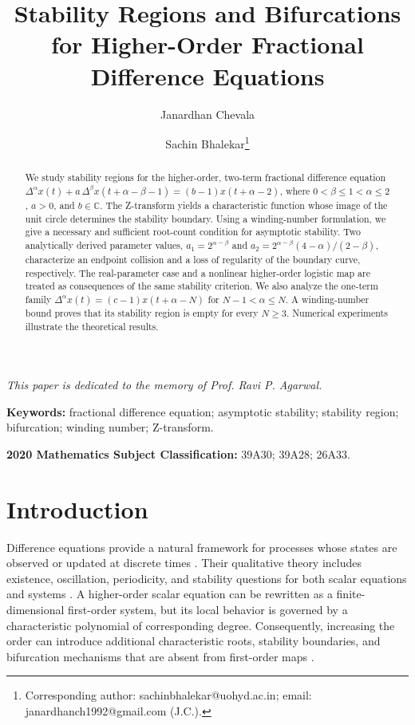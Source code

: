 \documentclass[11pt,a4paper]{article}
\title{Stability Regions and Bifurcations for Higher-Order Fractional Difference Equations}
\author{Janardhan Chevala}
\author{Sachin Bhalekar\footnote{Corresponding author: sachinbhalekar@uohyd.ac.in; email: janardhanch1992@gmail.com (J.C.).}}
\affil{School of Mathematics and Statistics, University of Hyderabad, Hyderabad 500046, India}
\date{}
\theoremstyle{definition}
\begin{document}
	
	\maketitle
\textit{This paper is dedicated to the memory of Prof. Ravi P. Agarwal.}
\begin{abstract}
We study stability regions for the higher-order, two-term fractional difference equation $\Delta^{\alpha}x(t) + a\,\Delta^{\beta}x(t + \alpha - \beta - 1) = (b - 1)x(t + \alpha - 2)$, where $0 < \beta \leq 1 < \alpha \leq 2$, $a > 0$, and $b \in \mathbb{C}$. The Z-transform yields a characteristic function whose image of the unit circle determines the stability boundary. Using a winding-number formulation, we give a necessary and sufficient root-count condition for asymptotic stability. Two analytically derived parameter values, $a_1 = 2^{\alpha-\beta}$ and $a_2 = 2^{\alpha-\beta}(4 - \alpha)/(2 - \beta)$, characterize an endpoint collision and a loss of regularity of the boundary curve, respectively. The real-parameter case and a nonlinear higher-order logistic map are treated as consequences of the same stability criterion. We also analyze the one-term family $\Delta^{\alpha}x(t) = (c - 1)x(t + \alpha - N)$ for $N - 1 < \alpha \leq N$. A winding-number bound proves that its stability region is empty for every $N \geq 3$. Numerical experiments illustrate the theoretical results.
\end{abstract}	
\medskip
\noindent\textbf{Keywords:} fractional difference equation; asymptotic stability; stability region; bifurcation; winding number; Z-transform.

\noindent\textbf{2020 Mathematics Subject Classification:} 39A30; 39A28; 26A33.


\section{Introduction} 
Difference equations provide a natural framework for processes whose states are observed or updated at discrete times \cite{kelley2001difference,elaydi2005introduction}. Their qualitative theory includes existence, oscillation, periodicity, and stability questions for both scalar equations and systems \cite{agarwal2000difference,agarwal2013advanced}. A higher-order scalar equation can be rewritten as a finite-dimensional first-order system, but its local behavior is governed by a characteristic polynomial of corresponding degree. Consequently, increasing the order can introduce additional characteristic roots, stability boundaries, and bifurcation mechanisms that are absent from first-order maps \cite{kocic1993global,elaydi2005introduction}.
\end{document}
